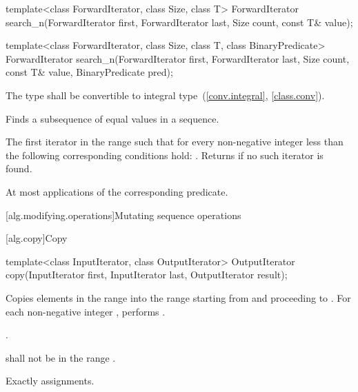 %
\begin{itemdecl}
template<class ForwardIterator, class Size, class T>
  ForwardIterator
    search_n(ForwardIterator first, ForwardIterator last, Size count,
           const T& value);

template<class ForwardIterator, class Size, class T,
         class BinaryPredicate>
  ForwardIterator
    search_n(ForwardIterator first, ForwardIterator last, Size count,
           const T& value, BinaryPredicate pred);
\end{itemdecl}

\begin{itemdescr}
\pnum
\requires
The type
shall be convertible to integral type~(\ref{conv.integral}, \ref{class.conv}).

\pnum
\effects
Finds a subsequence of equal values in a sequence.

\pnum
\returns
The first iterator
in the range 
such that for every non-negative integer
less than
the following corresponding conditions hold:
.
Returns 
if no such iterator is found.

\pnum
\complexity
At most
applications of the corresponding predicate.
\end{itemdescr}

[alg.modifying.operations]{Mutating sequence operations}

[alg.copy]{Copy}

%
\begin{itemdecl}
template<class InputIterator, class OutputIterator>
  OutputIterator copy(InputIterator first, InputIterator last,
                      OutputIterator result);
\end{itemdecl}

\begin{itemdescr}
\pnum
\effects Copies elements in the range  into the range  starting from  and proceeding to . For each non-negative integer , performs .

\pnum
\returns {}.

\pnum
\requires {} shall not be in the range .

\pnum
\complexity Exactly  assignments.
\end{itemdescr}

